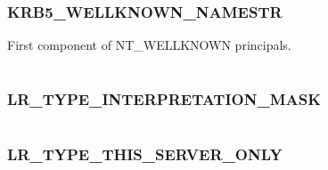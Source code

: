 \documentclass[letterpaper,10pt,english]{sphinxmanual}
\begin{document}
\subsubsection{KRB5\_WELLKNOWN\_NAMESTR}
\label{appdev/refs/macros/KRB5_WELLKNOWN_NAMESTR::doc}\label{appdev/refs/macros/KRB5_WELLKNOWN_NAMESTR:krb5-wellknown-namestr}\label{appdev/refs/macros/KRB5_WELLKNOWN_NAMESTR:krb5-wellknown-namestr-data}

\begin{fulllineitems}
\label{appdev/refs/macros/KRB5_WELLKNOWN_NAMESTR:KRB5_WELLKNOWN_NAMESTR}
\end{fulllineitems}


First component of NT\_WELLKNOWN principals.

\begin{tabulary}{\linewidth}{|L|L|}
\hline

 & 
\\
\hline\end{tabulary}



\subsubsection{LR\_TYPE\_INTERPRETATION\_MASK}
\label{appdev/refs/macros/LR_TYPE_INTERPRETATION_MASK:lr-type-interpretation-mask-data}\label{appdev/refs/macros/LR_TYPE_INTERPRETATION_MASK:lr-type-interpretation-mask}\label{appdev/refs/macros/LR_TYPE_INTERPRETATION_MASK::doc}

\begin{fulllineitems}
\label{appdev/refs/macros/LR_TYPE_INTERPRETATION_MASK:LR_TYPE_INTERPRETATION_MASK}
\end{fulllineitems}


\begin{tabulary}{\linewidth}{|L|L|}
\hline

 & 
\\
\hline\end{tabulary}



\subsubsection{LR\_TYPE\_THIS\_SERVER\_ONLY}
\label{appdev/refs/macros/LR_TYPE_THIS_SERVER_ONLY:lr-type-this-server-only-data}\label{appdev/refs/macros/LR_TYPE_THIS_SERVER_ONLY:lr-type-this-server-only}\label{appdev/refs/macros/LR_TYPE_THIS_SERVER_ONLY::doc}
\end{document}
